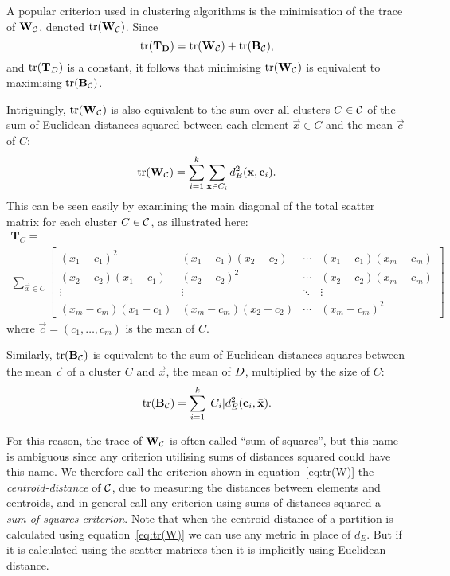 A popular criterion used in clustering algorithms is the minimisation of the
trace of $\mathbf{W_{\mathcal{C}}}$, denoted $\operatorname*{tr}(\mathbf{W_{\mathcal{C}}})$.  Since
\begin{equation*}
  \operatorname*{tr}(\mathbf{T_{D}}) = \operatorname*{tr}(\mathbf{W_{\mathcal{C}}}) + \operatorname*{tr}(\mathbf{B_{\mathcal{C}}}),
\end{equation*}
and $\operatorname*{tr}(\mathbf{T}_{D})$ is a constant, it follows that minimising
$\operatorname*{tr}(\mathbf{W_{\mathcal{C}}})$ is equivalent to maximising
$\operatorname*{tr}(\mathbf{B_{\mathcal{C}}})$.

Intriguingly, $\operatorname*{tr}(\mathbf{W}_{\mathcal{C}})$ is also equivalent to the sum over all
clusters $C \in \mathcal{C}$ of the sum of Euclidean distances squared between each
element $\vec{x} \in C$ and the mean $\vec{c}$ of $C$:
\begin{equation}
  \label{eq:tr(W)}
  \operatorname*{tr}(\mathbf{W_{\mathcal{C}}}) = \sum_{i=1}^{k} \sum_{\mathbf{x} \in C_i}
  d_{E}^2(\mathbf{x},\mathbf{c}_i).
\end{equation}
This can be seen easily by examining the main diagonal of the total scatter
matrix for each cluster $C \in \mathcal{C}$, as illustrated here:
\begin{multline*}
  \mathbf{T}_{C} = \\
  \sum_{\vec{x} \in C}
  \begin{bmatrix}
    (x_1-c_{1})^2 & (x_1-c_{1})(x_2-c_{2}) & \cdots &
    (x_1-c_{1})(x_m-c_{m}) \\
    (x_2-c_{2})(x_1-c_{1}) & (x_2-c_{2})^2 & \cdots &
    (x_2-c_{2})(x_m-c_{m}) \\
    \vdots & \vdots & \ddots & \vdots \\
    (x_m-c_{m})(x_1-c_{1}) & (x_m-c_{m})(x_2-c_{2}) & \cdots &
    (x_m-c_{m})^2
  \end{bmatrix}
\end{multline*}
where $\vec{c}=(c_1,\dotsc,c_m)$ is the mean of $C$.

Similarly, $\operatorname*{tr}(\mathbf{B_{\mathcal{C}}})$ is equivalent to the sum of Euclidean
distances squares between the mean $\vec{c}$ of a cluster $C$ and
$\bar{\vec{x}}$, the mean of $D$, multiplied by the size of $C$:
\begin{equation}
  \label{eq:tr(B)}
  \operatorname*{tr}(\mathbf{B_{\mathcal{C}}}) = \sum_{i=1}^{k} |C_i| d_E^2(\mathbf{c}_i,\bar{\mathbf{x}}).
\end{equation}

For this reason, the trace of $\mathbf{W}_{\mathcal{C}}$ is often called
``sum-of-squares'', but this name is ambiguous since any criterion utilising
sums of distances squared could have this name.  We therefore call the
criterion shown in equation~\eqref{eq:tr(W)} the \textit{centroid-distance} of
$\mathcal{C}$, due to measuring the distances between elements and centroids, and in
general call any criterion using sums of distances squared a
\textit{sum-of-squares criterion}.  Note that when the centroid-distance of a
partition is calculated using equation~\eqref{eq:tr(W)} we can use any metric
in place of $d_{E}$.  But if it is calculated using the scatter matrices then
it is implicitly using Euclidean distance.

